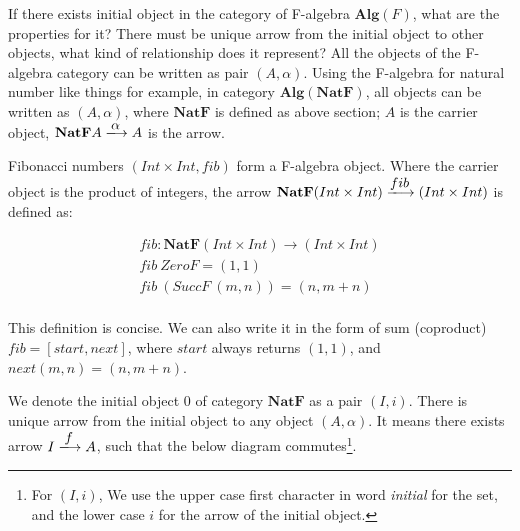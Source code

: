 \documentclass[b5paper]{article}
\begin{document}
If there exists initial object in the category of F-algebra $\pmb{Alg}(F)$, what are the properties for it? There must be unique arrow from the initial object to other objects, what kind of relationship does it represent? All the objects of the F-algebra category can be written as pair $(A, \alpha)$. Using the F-algebra for natural number like things for example, in category $\pmb{Alg}(\mathbf{NatF})$, all objects can be written as $(A, \alpha)$, where $\mathbf{NatF}$ is defined as above section; $A$ is the carrier object, $\mathbf{NatF} A \arrowto{\alpha} A$ is the arrow.





Fibonacci numbers $(Int \times Int, fib)$ form a F-algebra object. Where the carrier object is the product of integers, the arrow $\mathbf{NatF} (Int \times Int) \arrowto{fib} (Int \times Int)$ is defined as:

\[
\begin{array}{l}
fib : \mathbf{NatF} (Int \times Int) \to (Int \times Int) \\
fib\ ZeroF = (1, 1) \\
fib\ (SuccF\ (m, n)) = (n, m + n) \\
\end{array}
\]

This definition is concise. We can also write it in the form of sum (coproduct) $fib = [start, next]$, where $start$ always returns $(1, 1)$, and $next(m, n) = (n, m + n)$.

We denote the initial object 0 of category $\pmb{NatF}$ as a pair $(I, i)$. There is unique arrow from the initial object to any object $(A, \alpha)$. It means there exists arrow $I \arrowto{f} A$, such that the below diagram commutes\footnote{For $(I, i)$, We use the upper case first character in word {\em initial} for the set, and the lower case $i$ for the arrow of the initial object.}.
\end{document}
